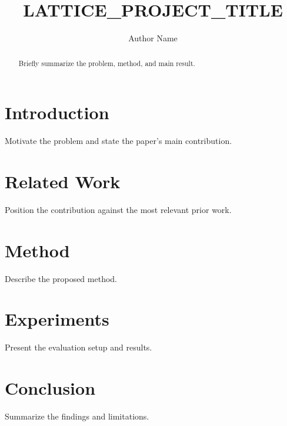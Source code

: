 \documentclass[letterpaper]{article}
\title{LATTICE_PROJECT_TITLE}
\author{Author Name}
\begin{document}
\maketitle

\begin{abstract}
Briefly summarize the problem, method, and main result.
\end{abstract}

\section{Introduction}
Motivate the problem and state the paper's main contribution.

\section{Related Work}
Position the contribution against the most relevant prior work.

\section{Method}
Describe the proposed method.

\section{Experiments}
Present the evaluation setup and results.

\section{Conclusion}
Summarize the findings and limitations.


\end{document}
